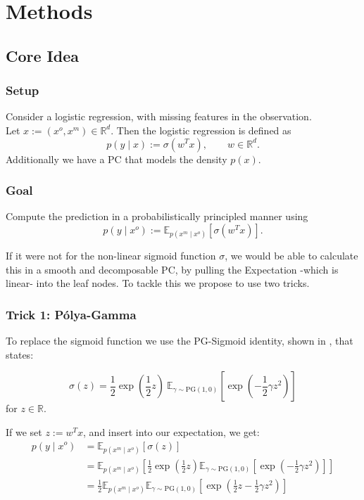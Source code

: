 \chapter{Methods}
\label{cha:methods}

\section{Core Idea}

\newcommand{\R}{\mathbb{R}}
\newcommand{\E}{\mathbb{E}}
\newcommand{\PG}{\mathrm{PG}}
\newcommand{\xo}{x^o}
\newcommand{\xm}{x^m}

\subsection{Setup} Consider a logistic regression, with missing features in the observation.\\ 
Let $x := (\xo, \xm) \in \R^{d}$. Then the logistic regression is defined as
\[
  p(y \mid x) := \sigma (w^T x), \qquad w \in \R^{d}.
\]
Additionally we have a PC that models the density $p(x)$.

\subsection{Goal} Compute the prediction in a probabilistically principled manner using
\[
  p(y \mid \xo) := \E_{p(\xm \mid \xo)} \left[\sigma \left( w^T x \right) \right].
\]

If it were not for the non-linear sigmoid function $\sigma$, we would be able to calculate this in a smooth 
and decomposable PC, by pulling the Expectation -which is linear- into the leaf nodes. To tackle this we propose to use two tricks.

\subsection{Trick 1: Pólya-Gamma}

To replace the sigmoid function we use the PG-Sigmoid identity, shown in \cite{polyagamma}, that states:

\[
  \sigma(z) = \frac{1}{2} \exp \left(\frac{1}{2}z\right) \
  \E_{\gamma \sim \PG(1,0)} \left[\exp \left(-\frac{1}{2} \gamma z^2 \right)\right]
\]
for $z \in \R$.

If we set $z := w^T x$, and insert into our expectation, we get:
\begin{align*}
  p(y \mid \xo)
  & = \E_{p(\xm \mid \xo)} \left[\sigma(z)\right] \\
  & = \E_{p(\xm \mid \xo)} \left[
       \frac{1}{2}\exp \left(\frac{1}{2}z\right)
       \E_{\gamma \sim \PG(1,0)} \left[\exp \left(-\frac{1}{2}\gamma z^2 \right)\right]
     \right] \\
  & = \frac{1}{2} \E_{p(\xm \mid \xo)} \E_{\gamma \sim \PG(1,0)}
    \left[ \exp \left(\frac{1}{2}z - \frac{1}{2}\gamma z^2 \right) \right]
\end{align*}

